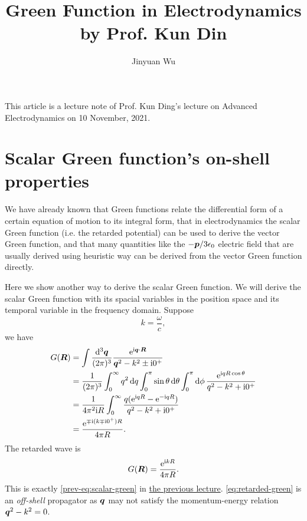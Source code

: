 \documentclass[hyperref, a4paper]{article}
\title{Green Function in Electrodynamics by Prof. Kun Din}
\author{Jinyuan Wu}
\newcommand*{\ii}{\mathrm{i}}
\newcommand*{\ee}{\mathrm{e}}
\newcommand{\prevdoc}{\href{./lecture-11-3}{the previous lecture}}
\begin{document}
\maketitle

This article is a lecture note of Prof. Kun Ding's lecture on Advanced Electrodynamics on 10 November, 2021.

\section{Scalar Green function's on-shell properties}

We have already known that Green functions relate the differential form of a certain equation of motion to its
integral form, that in electrodynamics the scalar Green function (i.e. the retarded potential) can be used to
derive the vector Green function, and that many quantities like the $- \vb*{p} / 3\epsilon_0$ electric field 
that are usually derived using heuristic way can be derived from the vector Green function directly.

Here we show another way to derive the scalar Green function. We will derive the scalar Green function with its spacial variables in the position space and its temporal variable in the frequency domain.
Suppose
\begin{equation}
    k = \frac{\omega}{c},
\end{equation}
we have 
\[
    \begin{aligned}
        G(\vb*{R}) &= \int \frac{\dd[3]{\vb*{q}}}{(2\pi)^3} \frac{\ee^{\ii \vb*{q} \cdot \vb*{R}}}{{\vb*{q}}^2 - k^2 \pm \ii 0^+} \\
        &= \frac{1}{(2\pi)^3} \int_0^\infty q^2 \dd{q} \int_0^\pi \sin \theta \dd{\theta} \int_0^\pi \dd{\phi}
        \frac{\ee^{\ii q R \cos \theta}}{q^2 - k^2 + \ii 0^+} \\
        &= \frac{1}{4 \pi^2 \ii R} \int_0^\infty \frac{q (\ee^{\ii q R} - \ee^{- \ii q R})}{q^2 - k^2 + \ii 0^+} \\
        &= \frac{\ee^{\mp \ii (k \mp \ii 0^+) R}}{4 \pi R}.
    \end{aligned}
\]
The retarded wave is 
\begin{equation}
    G(\vb*{R}) = \frac{\ee^{\ii k R}}{4 \pi R}.
    \label{eq:retarded-green}
\end{equation}
This is exactly \eqref{prev-eq:scalar-green} in \prevdoc.
\eqref{eq:retarded-green} is an \emph{off-shell} propagator as $\vb*{q}$ may not satisfy the momentum-energy relation $\vb*{q}^2 - k^2 = 0$.
\end{document}
